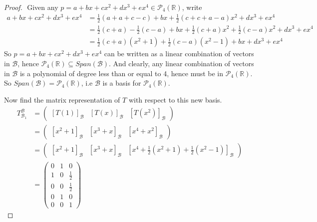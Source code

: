 \documentclass{article}
\begin{document}
\begin{proof}
$ $\newline
Given any $p = a+bx+cx^2+dx^3+ex^4 \in \mathcal{P}_4(\mathbb{R})$, write
\begin{align*}
a+bx+cx^2+dx^3+ex^4 &= \frac{1}{2}(a + a +  c - c) +bx+\frac{1}{2}(c +  c + a -a) x^2+dx^3+ex^4 \\
&= \frac{1}{2}(c+a) - \frac{1}{2}(c-a) + bx + \frac{1}{2}(c+a)x^2 +\frac{1}{2}(c-a)x^2 +dx^3+ex^4 \\
&= \frac{1}{2}(c+a)(x^2+1)+\frac{1}{2}(c-a)(x^2-1)+bx+dx^3+ex^4 
\end{align*}
So $p= a+bx+cx^2+dx^3+ex^4$ can be written as a linear combination of vectors in $\mathcal{B}$, hence $\mathcal{P}_4(\mathbb{R}) \subseteq Span(\mathcal{B})$. And clearly, any linear combination of vectors in $\mathcal{B}$ is a polynomial of degree less than or equal to 4, hence must be in $\mathcal{P}_4(\mathbb{R})$. So $Span(\mathcal{B}) = \mathcal{P}_4(\mathbb{R})$, i.e $\mathcal{B}$ is a basis for $\mathcal{P}_4(\mathbb{R})$.
\bigskip

Now find the matrix representation of $T$ with respect to this new basis.
\begin{align*}
T_{\mathcal{B}_1}^{\mathcal{B}} &= \begin{pmatrix}  [T(1)]_{\mathcal{B}} & [T(x)]_{\mathcal{B}} & [T(x^2)]_{\mathcal{B}}  \end{pmatrix} \\ 
&= \begin{pmatrix}  [x^2+1]_{\mathcal{B}} & [x^3+x]_{\mathcal{B}} & [x^4+x^2]_{\mathcal{B}}  \end{pmatrix} \\ 
&= \begin{pmatrix} [x^2+1]_{\mathcal{B}} & [x^3+x]_{\mathcal{B}} & [x^4+\frac{1}{2}(x^2+1)+\frac{1}{2}(x^2-1)]_{\mathcal{B}}  \end{pmatrix} \\
&= \begin{pmatrix} 0 &1&0 \\ 1&0&\frac{1}{2} \\ 0&0&\frac{1}{2} \\ 0&1&0 \\0&0&1 \end{pmatrix}
\end{align*}


\end{proof}
\end{document}

